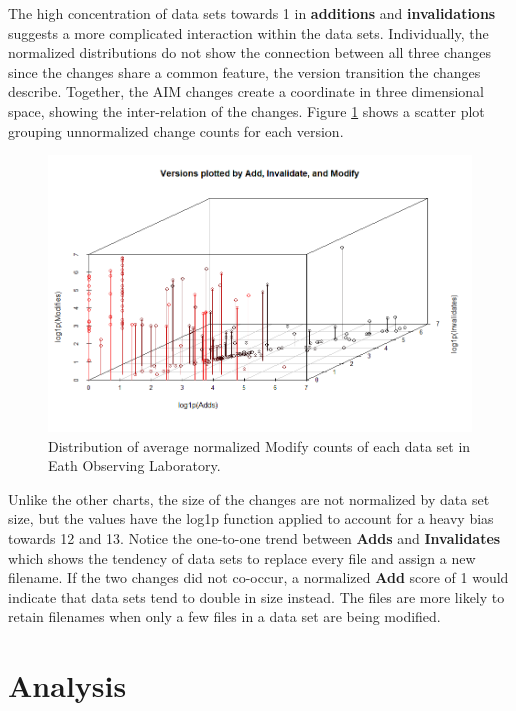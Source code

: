 The high concentration of data sets towards 1 in \textbf{additions} and \textbf{invalidations} suggests a more complicated interaction within the data sets.
Individually, the normalized distributions do not show the connection between all three changes since the changes share a common feature, the version transition the changes describe.
Together, the AIM changes create a coordinate in three dimensional space, showing the inter-relation of the changes. 
Figure \ref{EOL_AIM} shows a scatter plot grouping unnormalized change counts for each version.
\begin{figure}%
	\centering
	\includegraphics[scale=.6]{figures/Eol_Versions_3d.png}
	\caption{Distribution of average normalized Modify counts of each data set in Eath Observing Laboratory.}
	\label{EOL_AIM}
\end{figure}
Unlike the other charts, the size of the changes are not normalized by data set size, but the values have the log1p function applied to account for a heavy bias towards 12 and 13.
Notice the one-to-one trend between \textbf{Adds} and \textbf{Invalidates} which shows the tendency of data sets to replace every file and assign a new filename.
If the two changes did not co-occur, a normalized \textbf{Add} score of 1 would indicate that data sets tend to double in size instead.
The files are more likely to retain filenames when only a few files in a data set are being modified.

\section{Analysis}

